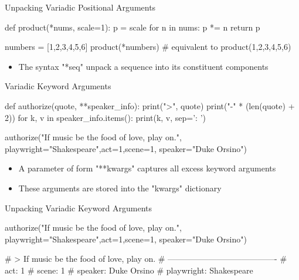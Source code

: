 \documentclass[serif, aspectratio=169]{beamer}
\begin{document}
\begin{frame}[fragile]{Unpacking Variadic Positional Arguments}
    \begin{pythoncode}
    def product(*nums, scale=1):
        p = scale
        for n in nums:
            p *= n
        return p

    numbers = [1,2,3,4,5,6]
    product(*numbers) # equivalent to product(1,2,3,4,5,6)
    \end{pythoncode}
    \begin{block}{}
        \begin{itemize}
            \item The syntax "*seq" unpack a sequence into its constituent components
        \end{itemize}
    \end{block}
\end{frame}

\begin{frame}[fragile]{Variadic Keyword Arguments}
    \begin{pythoncode}
    def authorize(quote, **speaker_info):
        print(">", quote)
        print("-" * (len(quote) + 2))
        for k, v in speaker_info.items():
        print(k, v, sep=': ')

    authorize("If music be the food of love, play on.",
              playwright="Shakespeare",act=1,scene=1,
              speaker="Duke Orsino")
    \end{pythoncode}
    \begin{block}{}
        \begin{itemize}
            \item A parameter of form "**kwargs" captures all excess keyword arguments
            \item These arguments are stored into the "kwargs" dictionary
        \end{itemize}
    \end{block}
\end{frame}

\begin{frame}[fragile]{Unpacking Variadic Keyword Arguments}
    \begin{pythoncode}
    authorize("If music be the food of love, play on.",
               playwright="Shakespeare",act=1,scene=1,
               speaker="Duke Orsino")

    # > If music be the food of love, play on.
    # ----------------------------------------
    # act: 1
    # scene: 1
    # speaker: Duke Orsino
    # playwright: Shakespeare
    \end{pythoncode}
\end{frame}
\end{document}
